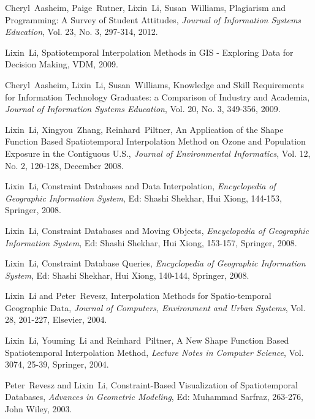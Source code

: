 \documentclass[10pt]{article}
\begin{document}
\begin{bibenum}
\item Cheryl~Aasheim, Paige~Rutner, Lixin~Li, Susan~Williams, Plagiarism 
and Programming: A Survey of Student Attitudes, {\it Journal of Information 
Systems Education}, Vol. 23, No. 3, 297-314, 2012.

\item Lixin~Li, Spatiotemporal Interpolation Methods in GIS - Exploring Data 
for Decision Making, VDM, 2009.

\item Cheryl~Aasheim, Lixin~Li, Susan~Williams, Knowledge and
Skill Requirements for Information Technology Graduates: a
Comparison of Industry and Academia, {\it Journal of Information
Systems Education}, Vol. 20, No. 3, 349-356, 2009.

\item Lixin~Li, Xingyou~Zhang, Reinhard~Piltner, An Application of
the Shape Function Based Spatiotemporal Interpolation Method on
Ozone and Population Exposure in the Contiguous U.S., {\it Journal
of Environmental Informatics}, Vol. 12, No. 2, 120-128, December 2008.

\item Lixin~Li, Constraint Databases and Data Interpolation, {\it
Encyclopedia of Geographic Information System}, Ed: Shashi
Shekhar, Hui Xiong, 144-153, Springer, 2008.

\item Lixin~Li, Constraint Databases and Moving Objects, {\it
Encyclopedia of Geographic Information System}, Ed: Shashi
Shekhar, Hui Xiong, 153-157, Springer, 2008.

\item Lixin~Li, Constraint Database Queries, {\it Encyclopedia of
Geographic Information System}, Ed: Shashi Shekhar, Hui Xiong,
140-144, Springer, 2008.

\item Lixin~Li and Peter~Revesz, Interpolation Methods for
Spatio-temporal Geographic Data, {\it Journal of Computers,
Environment and Urban Systems}, Vol. 28, 201-227, Elsevier, 2004.

\item Lixin~Li, Youming~Li and Reinhard~Piltner, A New Shape
Function Based Spatiotemporal Interpolation Method, {\it Lecture
Notes in Computer Science}, Vol. 3074, 25-39, Springer, 2004.

\item Peter~Revesz and Lixin~Li, Constraint-Based Visualization of
Spatiotemporal Databases, {\it Advances in Geometric Modeling},
Ed: Muhammad Sarfraz, 263-276, John Wiley, 2003.


\end{bibenum}
\end{document}
